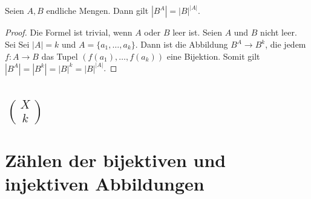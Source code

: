 \begin{thm}
	Seien $A,B $ endliche Mengen. Dann gilt $|B^A| = |B|^{|A|}$. 
\end{thm}
\begin{proof}
	Die Formel ist trivial, wenn $A$ oder $B$ leer ist. Seien $A$ und $B$ nicht leer. Sei Sei $|A| = k$ und $A = \{a_1,\ldots,a_k\}$. Dann ist die Abbildung $B^A \to B^k$, die jedem $f : A \to B$ das Tupel $(f(a_1),\ldots,f(a_k))$ eine Bijektion. Somit gilt 
	$|B^A | = |B^k| = |B|^k = |B|^{|A|}$.  
\end{proof} 

\section{$\binom{X}{k}$}

\section{Zählen der bijektiven und injektiven Abbildungen} 